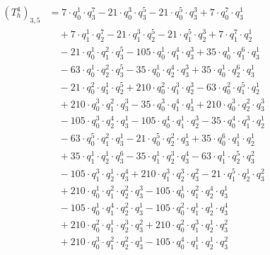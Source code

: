 \begin{align*}(T_{h}^4)_{3,5}&=7\cdot q_0^{1}\cdot q_3^{7}-21\cdot q_0^{3}\cdot q_3^{5}-21\cdot q_0^{5}\cdot q_3^{3}+7\cdot q_0^{7}\cdot q_3^{1}\\
&\quad +7\cdot q_1^{1}\cdot q_2^{7}-21\cdot q_1^{3}\cdot q_2^{5}-21\cdot q_1^{5}\cdot q_2^{3}+7\cdot q_1^{7}\cdot q_2^{1}\\
&\quad -21\cdot q_0^{1}\cdot q_1^{2}\cdot q_3^{5}-105\cdot q_0^{1}\cdot q_1^{4}\cdot q_3^{3}+35\cdot q_0^{1}\cdot q_1^{6}\cdot q_3^{1}\\
&\quad -63\cdot q_0^{1}\cdot q_2^{2}\cdot q_3^{5}-35\cdot q_0^{1}\cdot q_2^{4}\cdot q_3^{3}+35\cdot q_0^{1}\cdot q_2^{6}\cdot q_3^{1}\\
&\quad -21\cdot q_0^{2}\cdot q_1^{1}\cdot q_2^{5}+210\cdot q_0^{2}\cdot q_1^{3}\cdot q_2^{3}-63\cdot q_0^{2}\cdot q_1^{5}\cdot q_2^{1}\\
&\quad +210\cdot q_0^{3}\cdot q_1^{2}\cdot q_3^{3}-35\cdot q_0^{3}\cdot q_1^{4}\cdot q_3^{1}+210\cdot q_0^{3}\cdot q_2^{2}\cdot q_3^{3}\\
&\quad -105\cdot q_0^{3}\cdot q_2^{4}\cdot q_3^{1}-105\cdot q_0^{4}\cdot q_1^{1}\cdot q_2^{3}-35\cdot q_0^{4}\cdot q_1^{3}\cdot q_2^{1}\\
&\quad -63\cdot q_0^{5}\cdot q_1^{2}\cdot q_3^{1}-21\cdot q_0^{5}\cdot q_2^{2}\cdot q_3^{1}+35\cdot q_0^{6}\cdot q_1^{1}\cdot q_2^{1}\\
&\quad +35\cdot q_1^{1}\cdot q_2^{1}\cdot q_3^{6}-35\cdot q_1^{1}\cdot q_2^{3}\cdot q_3^{4}-63\cdot q_1^{1}\cdot q_2^{5}\cdot q_3^{2}\\
&\quad -105\cdot q_1^{3}\cdot q_2^{1}\cdot q_3^{4}+210\cdot q_1^{3}\cdot q_2^{3}\cdot q_3^{2}-21\cdot q_1^{5}\cdot q_2^{1}\cdot q_3^{2}\\
&\quad +210\cdot q_0^{1}\cdot q_1^{2}\cdot q_2^{2}\cdot q_3^{3}-105\cdot q_0^{1}\cdot q_1^{2}\cdot q_2^{4}\cdot q_3^{1}\\
&\quad -105\cdot q_0^{1}\cdot q_1^{4}\cdot q_2^{2}\cdot q_3^{1}-105\cdot q_0^{2}\cdot q_1^{1}\cdot q_2^{1}\cdot q_3^{4}\\
&\quad +210\cdot q_0^{2}\cdot q_1^{1}\cdot q_2^{3}\cdot q_3^{2}+210\cdot q_0^{2}\cdot q_1^{3}\cdot q_2^{1}\cdot q_3^{2}\\
&\quad +210\cdot q_0^{3}\cdot q_1^{2}\cdot q_2^{2}\cdot q_3^{1}-105\cdot q_0^{4}\cdot q_1^{1}\cdot q_2^{1}\cdot q_3^{2}\end{align*}
